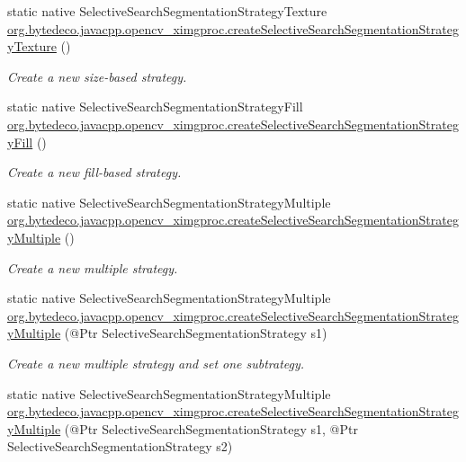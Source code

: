 \begin{DoxyCompactItemize}
static native Selective\+Search\+Segmentation\+Strategy\+Texture \hyperlink{group__ximgproc__segmentation_ga921f1030601ebcdad67662f016ebb6bf}{org.\+bytedeco.\+javacpp.\+opencv\+\_\+ximgproc.\+create\+Selective\+Search\+Segmentation\+Strategy\+Texture} ()
\begin{DoxyCompactList}\small\item\em Create a new size-\/based strategy. \end{DoxyCompactList}\item 
\mbox{\label{group__ximgproc__segmentation_ga6615570ea96beef3412287b4dddb312a}} 
static native Selective\+Search\+Segmentation\+Strategy\+Fill \hyperlink{group__ximgproc__segmentation_ga6615570ea96beef3412287b4dddb312a}{org.\+bytedeco.\+javacpp.\+opencv\+\_\+ximgproc.\+create\+Selective\+Search\+Segmentation\+Strategy\+Fill} ()
\begin{DoxyCompactList}\small\item\em Create a new fill-\/based strategy. \end{DoxyCompactList}\item 
\mbox{\label{group__ximgproc__segmentation_ga54fb05bc5e00a9a79578016f402c3a25}} 
static native Selective\+Search\+Segmentation\+Strategy\+Multiple \hyperlink{group__ximgproc__segmentation_ga54fb05bc5e00a9a79578016f402c3a25}{org.\+bytedeco.\+javacpp.\+opencv\+\_\+ximgproc.\+create\+Selective\+Search\+Segmentation\+Strategy\+Multiple} ()
\begin{DoxyCompactList}\small\item\em Create a new multiple strategy. \end{DoxyCompactList}\item 
static native Selective\+Search\+Segmentation\+Strategy\+Multiple \hyperlink{group__ximgproc__segmentation_ga6efb6138175a12479bd02b85f242afa1}{org.\+bytedeco.\+javacpp.\+opencv\+\_\+ximgproc.\+create\+Selective\+Search\+Segmentation\+Strategy\+Multiple} (@Ptr Selective\+Search\+Segmentation\+Strategy s1)
\begin{DoxyCompactList}\small\item\em Create a new multiple strategy and set one subtrategy. \end{DoxyCompactList}\item 
static native Selective\+Search\+Segmentation\+Strategy\+Multiple \hyperlink{group__ximgproc__segmentation_gaf769336116a86e1107367e971033e25b}{org.\+bytedeco.\+javacpp.\+opencv\+\_\+ximgproc.\+create\+Selective\+Search\+Segmentation\+Strategy\+Multiple} (@Ptr Selective\+Search\+Segmentation\+Strategy s1, @Ptr Selective\+Search\+Segmentation\+Strategy s2)

\end{DoxyCompactItemize}

